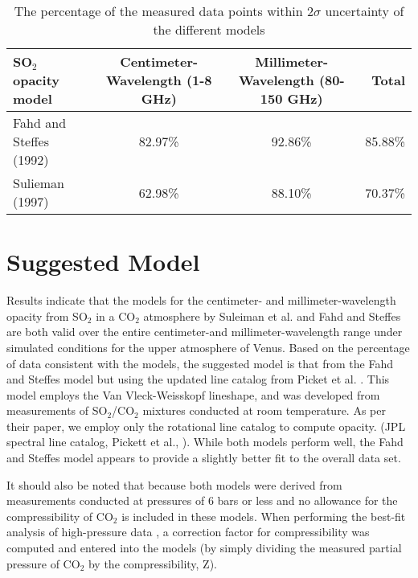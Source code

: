 \begin{sidewaystable}[p]

\caption{The percentage of the measured data points within $2\sigma$ uncertainty of the different models}
  \begin{tabular}{l | c c | r}
  \hline
  \hline
  SO$_2$ opacity model & Centimeter-Wavelength (1-8 GHz) & Millimeter-Wavelength (80-150 GHz) &Total\\
  \hline
  Fahd and Steffes (1992)	 & 82.97\%	& 	92.86\%& 85.88\%\\
  Sulieman (1997)& 62.98\%	&	88.10\%&70.37\%\\
  \hline
  \hline
  \end{tabular}
  \label{tab:model-comp}
\end{sidewaystable}

 


\clearpage

\section{Suggested Model}
Results indicate that the models for the centimeter- and millimeter-wavelength opacity from SO$_2$ in a CO$_2$ atmosphere by Suleiman et al. \cite{Suleiman-1996} and Fahd and Steffes \cite{Fahd-1991} are both valid over the entire centimeter-and millimeter-wavelength range under simulated conditions for the upper atmosphere of Venus. Based on the percentage of data consistent with the models, the suggested model is that from the Fahd and Steffes \cite{Fahd-thesis} model but using the updated line catalog from Picket et al. \cite{Pickett-1998}. This model employs the Van Vleck-Weisskopf lineshape, and was developed from measurements of SO$_2$/CO$_2$ mixtures conducted at room temperature. As per their paper, we employ only the rotational line catalog to compute opacity. (JPL spectral line catalog, Pickett et al., \cite{Pickett-1998}). While both models perform well, the Fahd and Steffes \cite{Fahd-1991}  model appears to provide a slightly better fit to the overall data set. 

It should also be noted that because both models were derived from measurements conducted at pressures of 6 bars or less and no allowance for the compressibility of CO$_2$ is included in these models. When performing the best-fit analysis of high-pressure data \cite{Steffes-2014}, a correction factor for compressibility was computed and entered into the models (by simply dividing the measured partial pressure of CO$_2$ by the compressibility, Z). 

